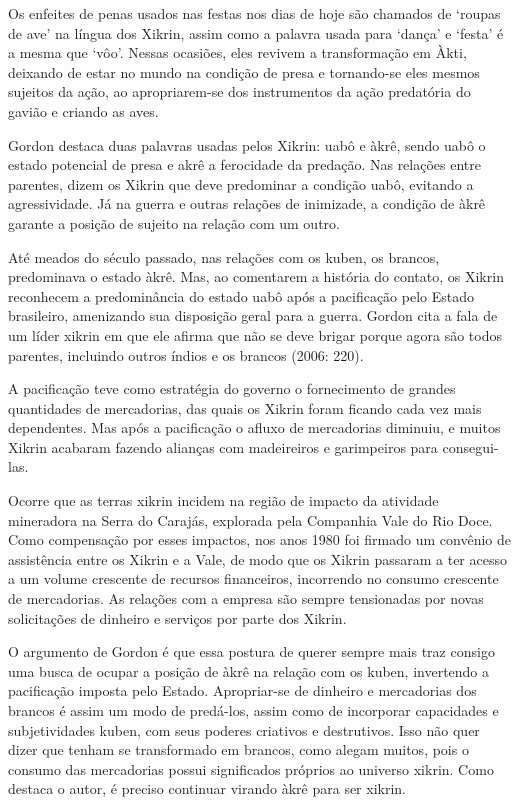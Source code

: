 \documentclass{article}
\begin{document}
Os enfeites de penas usados nas festas nos dias de hoje s\~ao chamados
de {\textquoteleft}roupas de ave{\textquoteright} na l\'ingua dos
Xikrin, assim como a palavra usada para
{\textquoteleft}dan\c{c}a{\textquoteright} e
{\textquoteleft}festa{\textquoteright} \'e a mesma que
{\textquoteleft}v\^oo{\textquoteright}. Nessas ocasi\~oes, eles revivem
a transforma\c{c}\~ao em \`Akti, deixando de estar no mundo na
condi\c{c}\~ao de presa e tornando-se eles mesmos sujeitos da
a\c{c}\~ao, ao apropriarem-se dos instrumentos da a\c{c}\~ao
predat\'oria do gavi\~ao e criando as aves.

Gordon destaca duas palavras usadas pelos Xikrin: uab\^o e \`akr\^e,
sendo uab\^o o estado potencial de presa e akr\^e a ferocidade da
preda\c{c}\~ao. Nas rela\c{c}\~oes entre parentes, dizem os Xikrin que
deve predominar a condi\c{c}\~ao uab\^o, evitando a agressividade. J\'a
na guerra e outras rela\c{c}\~oes de inimizade, a condi\c{c}\~ao de
\`akr\^e garante a posi\c{c}\~ao de sujeito na rela\c{c}\~ao com um
outro. 

At\'e meados do s\'eculo passado, nas rela\c{c}\~oes com os kuben, os
brancos, predominava o estado \`akr\^e. Mas, ao comentarem a hist\'oria
do contato, os Xikrin reconhecem a predomin\^ancia do estado uab\^o
ap\'os a pacifica\c{c}\~ao pelo Estado brasileiro, amenizando sua
disposi\c{c}\~ao geral para a guerra. Gordon cita a fala de um l\'ider
xikrin em que ele afirma que n\~ao se deve brigar porque agora s\~ao
todos parentes, incluindo outros \'indios e os brancos (2006: 220). 

A pacifica\c{c}\~ao teve como estrat\'egia do governo o fornecimento de
grandes quantidades de mercadorias, das quais os Xikrin foram ficando
cada vez mais dependentes. Mas ap\'os a pacifica\c{c}\~ao o afluxo de
mercadorias diminuiu, e muitos Xikrin acabaram fazendo alian\c{c}as com
madeireiros e garimpeiros para consegui-las. 

Ocorre que as terras xikrin incidem na regi\~ao de impacto da atividade
mineradora na Serra do Caraj\'as, explorada pela Companhia Vale do Rio
Doce. Como compensa\c{c}\~ao por esses impactos, nos anos 1980 foi
firmado um conv\^enio de assist\^encia entre os Xikrin e a Vale, de
modo que os Xikrin passaram a ter acesso a um volume crescente de
recursos financeiros, incorrendo no consumo crescente de mercadorias.
As rela\c{c}\~oes com a empresa s\~ao sempre tensionadas por novas
solicita\c{c}\~oes de dinheiro e servi\c{c}os por parte dos Xikrin. 

O argumento de Gordon \'e que essa postura de querer sempre mais traz
consigo uma busca de ocupar a posi\c{c}\~ao de \`akr\^e na
rela\c{c}\~ao com os kuben, invertendo a pacifica\c{c}\~ao imposta pelo
Estado. Apropriar-se de dinheiro e mercadorias dos brancos \'e assim um
modo de pred\'a-los, assim como de incorporar capacidades e
subjetividades kuben, com seus poderes criativos e destrutivos. Isso
n\~ao quer dizer que tenham se transformado em brancos, como alegam
muitos, pois o consumo das mercadorias possui significados pr\'oprios
ao universo xikrin. Como destaca o autor, \'e preciso continuar virando
\`akr\^e para ser xikrin.
\end{document}
